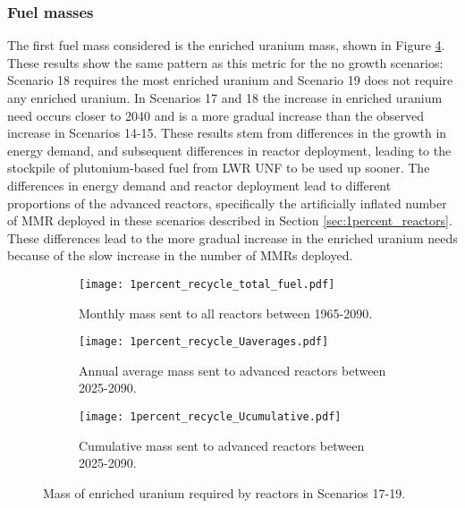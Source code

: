 \subsubsection{Fuel masses}
The first fuel mass considered is the enriched uranium mass, 
shown in Figure \ref{fig:1percent_recycle_uranium}. These results 
show the same pattern as this metric for the no growth scenarios:
Scenario 18 requires the most enriched uranium and Scenario 19 
does not require any enriched uranium. In Scenarios 17 and 18 the 
increase in enriched uranium need occurs closer to 2040 and is a 
more gradual increase than the observed increase in Scenarios 14-15. 
These results stem from differences in the growth in energy 
demand, and subsequent differences in reactor deployment, leading to the stockpile 
of plutonium-based fuel from \gls{LWR} \gls{UNF} to be used up sooner. 
The differences in energy demand and reactor deployment lead to different 
proportions of the advanced reactors, specifically the artificially
inflated number of \gls{MMR} deployed in these scenarios described 
in Section \ref{sec:1percent_reactors}. These differences 
lead to the more gradual increase in the enriched uranium needs
because of the slow increase in the number of \glspl{MMR} deployed.

\begin{figure}[h!]
    \centering
    \begin{subfigure}[b]{0.45\textwidth}
        \centering
        \texttt{[image: 1percent\_recycle\_total\_fuel.pdf]}
        \caption{Monthly mass sent to all reactors 
        between 1965-2090.}
        \label{fig:1percent_recycle_all_uranium}
    \end{subfigure}
    \hfill
    \begin{subfigure}[b]{0.45\textwidth}
        \centering
        \texttt{[image: 1percent\_recycle\_Uaverages.pdf]}
        \caption{Annual average mass sent to 
        advanced reactors between 2025-2090.}
        \label{fig:1percent_recycle_AR_uranium}
    \end{subfigure}
    \begin{subfigure}[b]{0.45\textwidth}
        \centering
        \texttt{[image: 1percent\_recycle\_Ucumulative.pdf]}
        \caption{Cumulative mass sent to advanced reactors between 2025-2090.}
        \label{fig:1percent_recycle_uranium_cumulative}
    \end{subfigure}
       \caption{Mass of enriched uranium required by reactors
        in Scenarios 17-19.}
       \label{fig:1percent_recycle_uranium}
\end{figure}


